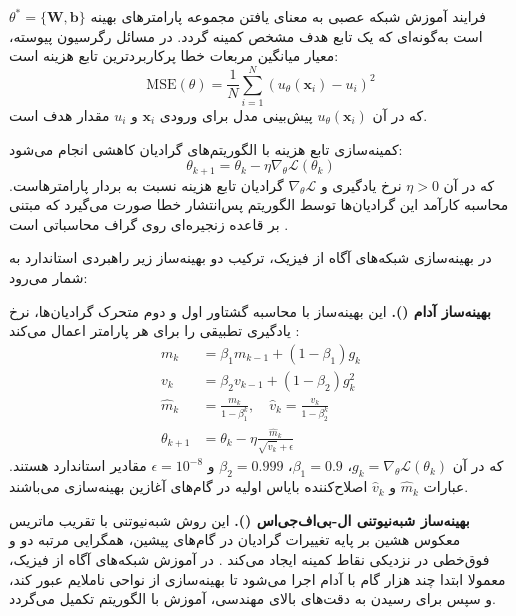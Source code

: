 فرایند آموزش شبکه عصبی به معنای یافتن مجموعه پارامترهای بهینه $\theta^* = \{\mathbf{W}, \mathbf{b}\}$ است به‌گونه‌ای که یک تابع هدف مشخص کمینه گردد. در مسائل رگرسیون پیوسته، معیار میانگین مربعات خطا پرکاربردترین تابع هزینه است:
\begin{equation}
\mathrm{MSE}(\theta) = \frac{1}{N}\sum_{i=1}^{N} \left(u_\theta(\mathbf{x}_i) - u_i\right)^2
\label{eq:mse}
\end{equation}
که در آن $u_\theta(\mathbf{x}_i)$ پیش‌بینی مدل برای ورودی $\mathbf{x}_i$ و $u_i$ مقدار هدف است.

کمینه‌سازی تابع هزینه با الگوریتم‌های گرادیان کاهشی انجام می‌شود:
\begin{equation}
\theta_{k+1} = \theta_k - \eta \nabla_\theta \mathcal{L}(\theta_k)
\label{eq:gd}
\end{equation}
که در آن $\eta > 0$ نرخ یادگیری و $\nabla_\theta \mathcal{L}$ گرادیان تابع هزینه نسبت به بردار پارامترهاست. محاسبه کارآمد این گرادیان‌ها توسط الگوریتم پس‌انتشار خطا صورت می‌گیرد که مبتنی بر قاعده زنجیره‌ای روی گراف محاسباتی است \cite{rumelhart1986}.

در بهینه‌سازی شبکه‌های آگاه از فیزیک، ترکیب دو بهینه‌ساز زیر راهبردی استاندارد به شمار می‌رود:

\textbf{بهینه‌ساز آدام ().} این بهینه‌ساز با محاسبه گشتاور اول و دوم متحرک گرادیان‌ها، نرخ یادگیری تطبیقی را برای هر پارامتر اعمال می‌کند \cite{kingma2015}:
\begin{equation}
\begin{aligned}
m_k &= \beta_1 m_{k-1} + (1-\beta_1) g_k \\
v_k &= \beta_2 v_{k-1} + (1-\beta_2) g_k^2 \\
\hat{m}_k &= \frac{m_k}{1-\beta_1^k}, \quad \hat{v}_k = \frac{v_k}{1-\beta_2^k} \\
\theta_{k+1} &= \theta_k - \eta \frac{\hat{m}_k}{\sqrt{\hat{v}_k} + \epsilon}
\end{aligned}
\label{eq:adam}
\end{equation}
که در آن $g_k = \nabla_\theta \mathcal{L}(\theta_k)$، $\beta_1=0.9$، $\beta_2=0.999$ و $\epsilon=10^{-8}$ مقادیر استاندارد هستند. عبارات $\hat{m}_k$ و $\hat{v}_k$ اصلاح‌کننده بایاس اولیه در گام‌های آغازین بهینه‌سازی می‌باشند.

\textbf{بهینه‌ساز شبه‌نیوتنی ال-بی‌اف‌جی‌اس ().} این روش شبه‌نیوتنی با تقریب ماتریس معکوس هشین بر پایه تغییرات گرادیان در گام‌های پیشین، همگرایی مرتبه دو و فوق‌خطی در نزدیکی نقاط کمینه ایجاد می‌کند \cite{liu1989}. در آموزش شبکه‌های آگاه از فیزیک، معمولا ابتدا چند هزار گام با آدام اجرا می‌شود تا بهینه‌سازی از نواحی ناملایم عبور کند، و سپس برای رسیدن به دقت‌های بالای مهندسی، آموزش با الگوریتم  تکمیل می‌گردد.

